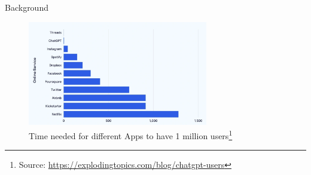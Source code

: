 \documentclass[t]{beamer}
\begin{document}
\begin{frame}{Background}
\begin{figure}
  \centering
  \includegraphics[width=0.7\textwidth]{1M users.png}
  \caption{Time needed for different Apps to have 1 million users\footnote{Source: \url{https://explodingtopics.com/blog/chatgpt-users}}}
\end{figure}
\end{frame}
\end{document}
